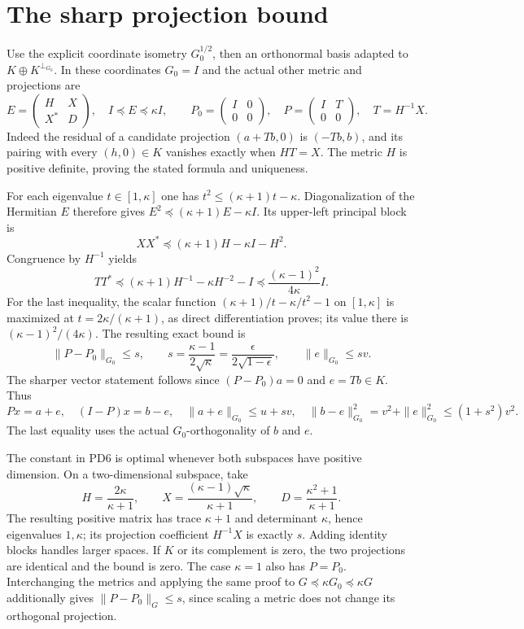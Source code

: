 \documentclass[11pt]{article}
\begin{document}
\section{The sharp projection bound}
Use the explicit coordinate isometry $G_0^{1/2}$, then an orthonormal
basis adapted to $K\oplus K^{\perp_{G_0}}$.  In these coordinates
$G_0=I$ and the actual other metric and projections are
\[
 E=\begin{pmatrix}H&X\\X^*&D\end{pmatrix},\quad I\preceq E\preceq\kappa I,
 \qquad P_0=\begin{pmatrix}I&0\\0&0\end{pmatrix},\quad
 P=\begin{pmatrix}I&T\\0&0\end{pmatrix},\quad T=H^{-1}X.          \tag{PD4}
\]
Indeed the residual of a candidate projection $(a+Tb,0)$ is
$(-Tb,b)$, and its pairing with every $(h,0)\in K$ vanishes exactly
when $HT=X$.  The metric $H$ is positive definite, proving the
stated formula and uniqueness.

For each eigenvalue $t\in[1,\kappa]$ one has
$t^2\le(\kappa+1)t-\kappa$.  Diagonalization of the Hermitian
$E$ therefore gives
$E^2\preceq(\kappa+1)E-\kappa I$.  Its upper-left principal block is
\[
 XX^*\preceq(\kappa+1)H-\kappa I-H^2.
\]
Congruence by $H^{-1}$ yields
\[
 TT^*\preceq(\kappa+1)H^{-1}-\kappa H^{-2}-I
           \preceq\frac{(\kappa-1)^2}{4\kappa}I.                 \tag{PD5}
\]
For the last inequality, the scalar function
$(\kappa+1)/t-\kappa/t^2-1$ on $[1,\kappa]$ is maximized at
$t=2\kappa/(\kappa+1)$, as direct differentiation proves; its
value there is $(\kappa-1)^2/(4\kappa)$.  The resulting exact bound is
\[
 \boxed{\|P-P_0\|_{G_0}\le s,
 \qquad s=\frac{\kappa-1}{2\sqrt\kappa}
          =\frac{\epsilon}{2\sqrt{1-\epsilon}},\qquad
 \|e\|_{G_0}\le s v.}                                           \tag{PD6}
\]
The sharper vector statement follows since $(P-P_0)a=0$ and
$e=Tb\in K$.  Thus
\[
 Px=a+e,\quad(I-P)x=b-e,\quad
 \|a+e\|_{G_0}\le u+sv,\quad
 \|b-e\|_{G_0}^2=v^2+\|e\|_{G_0}^2\le(1+s^2)v^2.              \tag{PD7}
\]
The last equality uses the actual $G_0$-orthogonality of $b$ and $e$.

The constant in PD6 is optimal whenever both subspaces have positive
dimension.  On a two-dimensional subspace, take
\[
 H=\frac{2\kappa}{\kappa+1},\qquad
 X=\frac{(\kappa-1)\sqrt\kappa}{\kappa+1},\qquad
 D=\frac{\kappa^2+1}{\kappa+1}.                                  \tag{PD8}
\]
The resulting positive matrix has trace $\kappa+1$ and determinant
$\kappa$, hence eigenvalues $1,\kappa$; its projection coefficient
$H^{-1}X$ is exactly $s$.  Adding identity blocks handles larger
spaces.  If $K$ or its complement is zero, the two projections
are identical and the bound is zero.  The case $\kappa=1$ also
has $P=P_0$.  Interchanging the metrics and applying the same proof
to $G\preceq\kappa G_0\preceq\kappa G$ additionally gives
$\|P-P_0\|_G\le s$, since scaling a metric does not change its
orthogonal projection.
\end{document}
